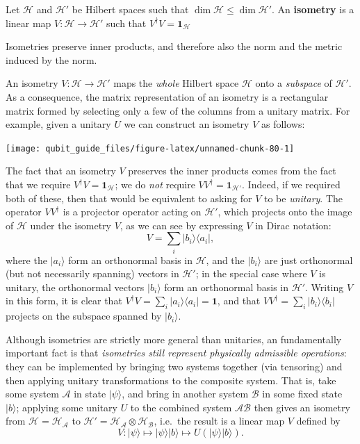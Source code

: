 \documentclass[fleqn,a4paper]{article}
\newenvironment{idea}{\everypar{\setlength{\parindent}{1.5em}}}{}
\theoremstyle{definition}
\theoremstyle{definition}
\theoremstyle{definition}
\theoremstyle{definition}
\theoremstyle{remark}
\begin{document}
\begin{idea}
Let \(\mathcal{H}\) and \(\mathcal{H}'\) be Hilbert spaces such that \(\dim\mathcal{H}\leqslant\dim\mathcal{H}'\).
An \textbf{isometry} is a linear map \(V\colon\mathcal{H}\to\mathcal{H}'\) such that \(V^\dagger V=\mathbf{1}_{\mathcal{H}}\)

Isometries preserve inner products, and therefore also the norm and the metric induced by the norm.

\end{idea}

An isometry \(V\colon\mathcal{H}\to\mathcal{H}'\) maps the \emph{whole} Hilbert space \(\mathcal{H}\) onto a \emph{subspace} of \(\mathcal{H}'\).
As a consequence, the matrix representation of an isometry is a rectangular matrix formed by selecting only a few of the columns from a unitary matrix.
For example, given a unitary \(U\) we can construct an isometry \(V\) as follows:

\begin{center}\texttt{[image: qubit\_guide\_files/figure-latex/unnamed-chunk-80-1]} \end{center}

The fact that an isometry \(V\) preserves the inner products comes from the fact that we require \(V^\dagger V=\mathbf{1}_{\mathcal{H}}\);
we do \emph{not} require \(VV^\dagger=\mathbf{1}_{\mathcal{H'}}\).
Indeed, if we required both of these, then that would be equivalent to asking for \(V\) to be \emph{unitary}.
The operator \(VV^\dagger\) is a projector operator acting on \(\mathcal{H}'\), which projects onto the image of \(\mathcal{H}\) under the isometry \(V\), as we can see by expressing \(V\) in Dirac notation:
\[
  V = \sum_i |b_i\rangle\langle a_i|,
\]
where the \(|a_i\rangle\) form an orthonormal basis in \(\mathcal{H}\), and the \(|b_i\rangle\) are just orthonormal (but not necessarily spanning) vectors in \(\mathcal{H}'\);
in the special case where \(V\) is unitary, the orthonormal vectors \(|b_i\rangle\) form an orthonormal basis in \(\mathcal{H}'\).
Writing \(V\) in this form, it is clear that \(V^\dagger V=\sum_i |a_i\rangle\langle a_i|=\mathbf{1}\), and that \(VV^\dagger = \sum_i |b_i\rangle\langle b_i|\) projects on the subspace spanned by \(|b_i\rangle\).

Although isometries are strictly more general than unitaries, an fundamentally important fact is that \emph{isometries still represent physically admissible operations}: they can be implemented by bringing two systems together (via tensoring) and then applying unitary transformations to the composite system.
That is, take some system \(\mathcal{A}\) in state \(|\psi\rangle\), and bring in another system \(\mathcal{B}\) in some fixed state \(|b\rangle\);
applying some unitary \(U\) to the combined system \(\mathcal{A}\mathcal{B}\) then gives an isometry from \(\mathcal{H}=\mathcal{H}_\mathcal{A}\) to \(\mathcal{H}'=\mathcal{H}_\mathcal{A}\otimes\mathcal{H}_\mathcal{B}\), i.e.~the result is a linear map \(V\) defined by
\[
  V\colon
  |\psi\rangle
  \longmapsto
  |\psi\rangle|b\rangle
  \longmapsto
  U(|\psi\rangle|b\rangle).
\]
\end{document}
